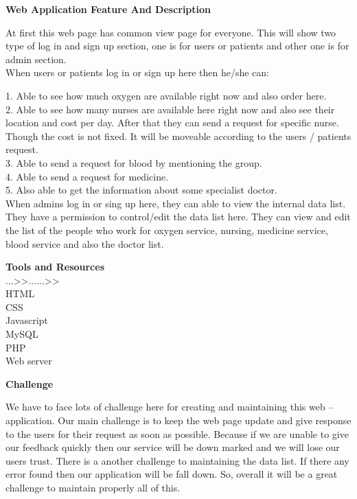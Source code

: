 \documentclass[a4paper,11pt]{paper}
\begin{document}
  \clearpage
   
 {\LARGE \textbf{Web Application Feature And Description} \\}
 \vspace{.5\baselineskip}
 
 At first this web page has common view page for everyone. This will show two type of log in and sign up  section, one is for users or patients and other one is for admin section.\\ When users or patients log in or sign up here then he/she can:\\
\vspace{.3\baselineskip}
 
1.	Able to see how much oxygen are available right now and also order here. \\
2.	Able to see how many nurses are available here right now and also see their location and cost per day. After that they can send a request for specific nurse. Though the cost is not fixed. It will be moveable according to the users / patients request.  \\
3.	Able to send a request for blood by mentioning the group.  \\
4.	Able to send a request for medicine. \\
5.	Also able to get the information about some specialist doctor.\\

When admins log in or sing up here, they can able to view the internal data list. They have a permission to control/edit the data list here. They can view and edit the list of the people who work for oxygen service, nursing, medicine service, blood service and also the doctor list.

\vspace{2\baselineskip}

   
 {\LARGE \textbf{Tools and Resources} \\}
 ...>>......>>\\
 HTML\\
 CSS\\
 Javascript\\
 MySQL\\
 PHP\\
 Web server\\
 

\vspace{2\baselineskip}

   
 {\LARGE \textbf{Challenge} \\}

We have to face lots of challenge here for creating and maintaining this web – application. Our main challenge is to keep the web page update and give response to the users for their request as soon as possible. Because if we are unable to give our feedback quickly then our service will be down marked and we will lose our users trust. There is a another challenge to maintaining the data list. If there any error found then our application will be fall down. So, overall it will be a great challenge to maintain properly all of this. 
\end{document}
